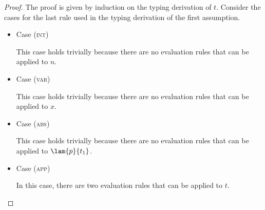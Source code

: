 \begin{proof}
The proof is given by induction on the typing derivation of $t$.
Consider the cases for the last rule used in the typing derivation of the first assumption.

\begin{itemize}
\item Case (\textsc{int})
\begin{center}
    \begin{minipage}{.25\linewidth}
    \end{minipage}
\end{center}
This case holds trivially because there are no evaluation rules that can be applied to $n$.
\\

\item Case (\textsc{var})
\begin{center}
    \begin{minipage}{.35\linewidth}
    \end{minipage}
\end{center}
This case holds trivially because there are no evaluation rules that can be applied to $x$.
\\

\item Case (\textsc{abs})
\begin{center}
    \begin{minipage}{.6\linewidth}
    \end{minipage}
\end{center}
This case holds trivially because there are no evaluation rules that can be applied to $\lam{p}{t_1}$.
\\

\item Case (\textsc{app})
\begin{center}
    \begin{minipage}{.65\linewidth}
    \end{minipage}
\end{center}
In this case, there are two evaluation rules that can be applied to $t$.


\end{itemize}
\end{proof}
